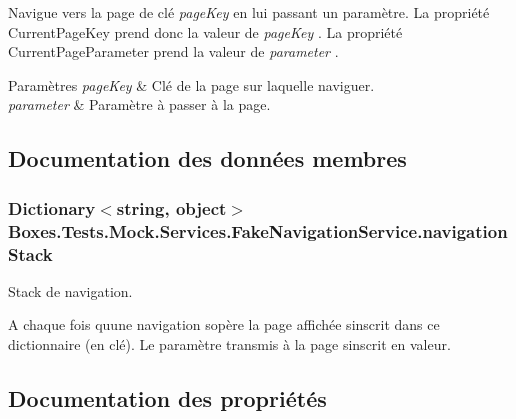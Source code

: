 Navigue vers la page de clé {\itshape page\+Key}  en lui passant un paramètre. La propriété {\ttfamily Current\+Page\+Key} prend donc la valeur de {\itshape page\+Key} . La propriété {\ttfamily Current\+Page\+Parameter} prend la valeur de {\itshape parameter} . 


\begin{DoxyParams}{Paramètres}
{\em page\+Key} & Clé de la page sur laquelle naviguer. \\
\hline
{\em parameter} & Paramètre à passer à la page. \\
\hline
\end{DoxyParams}


\subsection{Documentation des données membres}
\subsubsection[{\texorpdfstring{navigation\+Stack}{navigationStack}}]{\setlength{\rightskip}{0pt plus 5cm}Dictionary$<$string, object$>$ Boxes.\+Tests.\+Mock.\+Services.\+Fake\+Navigation\+Service.\+navigation\+Stack\hspace{0.3cm}{\ttfamily [private]}}\hypertarget{class_boxes_1_1_tests_1_1_mock_1_1_services_1_1_fake_navigation_service_ad295920ed186a7b945b3597c635f12e0}{}\label{class_boxes_1_1_tests_1_1_mock_1_1_services_1_1_fake_navigation_service_ad295920ed186a7b945b3597c635f12e0}


Stack de navigation. 

A chaque fois qu\textquotesingle{}une navigation s\textquotesingle{}opère la page affichée s\textquotesingle{}inscrit dans ce dictionnaire (en clé). Le paramètre transmis à la page s\textquotesingle{}inscrit en valeur. 

\subsection{Documentation des propriétés}
